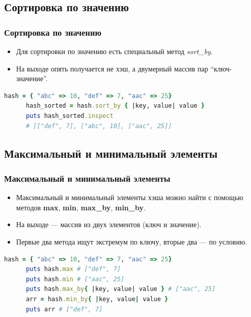 \documentclass[compress,red]{beamer}
\begin{document}
\subsection{Сортировка по значению}
\begin{frame}[fragile]
  \frametitle{Сортировка по значению}

  \begin{itemize}
    \item Для сортировки по значению есть специальный метод \emph{sort\_by}.
    \item На выходе опять получается не хэш, а двумерный массив пар ``ключ-значение''.
  \end{itemize}

  \scriptsize{
    \begin{lstlisting}[language=ruby,basicstyle=\footnotesize,label=ruby5,caption=Сортировка по ключам]
      hash = { "abc" => 10, "def" => 7, "aac" => 25}
      hash_sorted = hash.sort_by { |key, value| value }
      puts hash_sorted.inspect 
      # [["def", 7], ["abc", 10], ["aac", 25]]
    \end{lstlisting}
  }
  
\end{frame}

\subsection{Максимальный и минимальный элементы}
\begin{frame}[fragile]
  \frametitle{Максимальный и минимальный элементы}

  \begin{itemize}
    \item Максимальный и минимальный элементы хэша можно найти с помощью методов \textbf{max}, \textbf{min}, \textbf{max\_by}, \textbf{min\_by}.
    \item На выходе --- массив из двух элементов (ключ и значение). 
    \item Первые два метода ищут экстремум по ключу, вторые два --- по условию.
  \end{itemize}

  \scriptsize{
    \begin{lstlisting}[language=ruby,basicstyle=\footnotesize,label=ruby6,caption=Максимальный и минимальный элементы]
      hash = { "abc" => 10, "def" => 7, "aac" => 25}
      puts hash.max # ["def", 7]
      puts hash.min # ["aac", 25]
      puts hash.max_by{ |key, value| value } # ["aac", 25]
      arr = hash.min_by{ |key, value| value } 
      puts arr # ["def", 7]
    \end{lstlisting}
  }
\end{frame}
\end{document}

